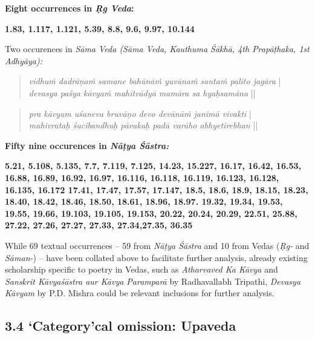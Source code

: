 \textbf{Eight occurrences in \textit{Ṛg Veda}:}

\textbf{1.83, 1.117, 1.121, 5.39, 8.8, 9.6, 9.97, 10.144}

Two occurences in \textit{Sāma Veda (Sāma Veda, Kauthuma Śākhā, 4th Prapāṭhaka, 1st Adhyāya):}

\vskip 4pt

\begin{verse}
\textit{vidhuṁ dadrāṇaṁ samane bahūnāṁ yuvānaṁ santaṁ palito jagāra} |\\\textit{devasya paśya kāvyaṁ mahitvādyā mamāra sa hyaḥ\break samāna} || 
\end{verse}

\vskip 4pt

\begin{verse}
\textit{pra kāvyam uśaneva bruvāṇo devo devānāṁ janimā vivakti} |\\\textit{mahivrataḥ śucibandhuḥ pāvakaḥ padā varāho abhyeti\break rebhan} || 
\end{verse}

\vskip 4pt

\newpage

\textbf{Fifty nine occurences in \textit{Nāṭya Śāstra:}}

\textbf{5.21, 5.108, 5.135, 7.7, 7.119, 7.125, 14.23, 15.227, 16.17, 16.42, 16.53, 16.88, 16.89, 16.92, 16.97, 16.116, 16.118, 16.119, 16.123, 16.128, 16.135, 16.172 17.41, 17.47, 17.57, 17.147, 18.5, 18.6, 18.9, 18.15, 18.23, 18.40, 18.42, 18.46, 18.50, 18.61, 18.96, 18.97. 19.32, 19.34, 19.53, 19.55, 19.66, 19.103, 19.105, 19.153, 20.22, 20.24, 20.29, 22.51, 25.88, 27.22, 27.26, 27.27, 27.33, 27.34,27.35, 36.35}

While 69 textual occurrences – 59 from \textit{Nāṭya Śāstra} and 10 from Vedas (\textit{Ṛg-} and \textit{Sāman-}) – have been collated above to facilitate further analysis, already existing scholarship specific to poetry in Vedas, such as \textit{Atharvaved Ka Kāvya} and \textit{Sanskrit Kāvyaśāstra aur Kāvya Paramparā} by Radhavallabh Tripathi, \textit{Devasya Kāvyam} by P.D. Mishra could be relevant inclusions for further analysis.


\subsection*{3.4 ‘Category'cal omission: Upaveda}

